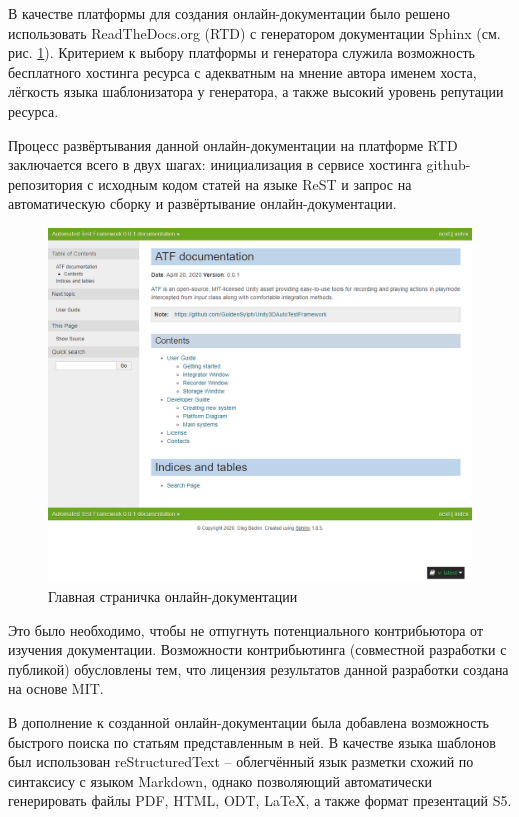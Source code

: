 В качестве платформы для создания онлайн-документации было решено использовать ReadTheDocs.org (RTD) с генератором документации Sphinx (см. рис. \ref{online_docs}). Критерием к выбору платформы и генератора служила возможность бесплатного хостинга ресурса с адекватным на мнение автора именем хоста, лёгкость языка шаблонизатора у генератора, а также высокий уровень репутации ресурса.

Процесс развёртывания данной онлайн-документации на платформе RTD заключается всего в двух шагах: инициализация в сервисе хостинга github-репозитория с исходным кодом статей на языке ReST и запрос на автоматическую сборку и развёртывание онлайн-документации.

\begin{figure}[H]
	\centering
	\includegraphics[width=\linewidth]{online_docs.png}
	\caption{Главная страничка онлайн-документации}
	\label{online_docs}
\end{figure}

Это было необходимо, чтобы не отпугнуть потенциального контрибьютора от изучения документации. Возможности контрибьютинга (совместной разработки с публикой) обусловлены тем, что лицензия результатов данной разработки создана на основе MIT.

В дополнение к созданной онлайн-документации была добавлена возможность быстрого поиска по статьям представленным в ней. В качестве языка шаблонов был использован reStructuredText -- облегчённый язык разметки схожий по синтаксису с языком Markdown, однако позволяющий автоматически генерировать файлы PDF, HTML, ODT, LaTeX, а также формат презентаций S5.


